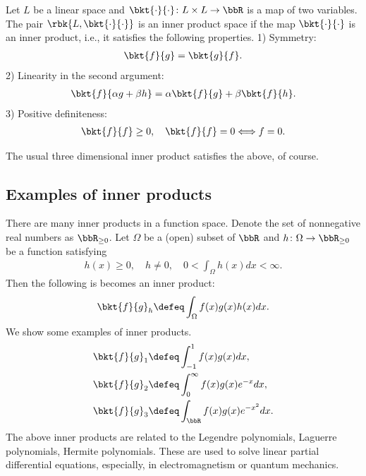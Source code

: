 \documentclass[openany, a4paper, oneside]{jsbook}
\begin{document}
\begin{axm}
 Let $L$ be a linear space and $\bkt{\cdot}{\cdot} \colon L \times L \to \bbR$ is a map of two variables.
 The pair $\rbk{L, \bkt{\cdot}{\cdot}}$ is an inner product space if the map $\bkt{\cdot}{\cdot}$ is an inner product,
 i.e., it satisfies the following properties.
 1) Symmetry:
  \begin{align}
   \bkt{f}{g} = \bkt{g}{f}.
  \end{align}
 2) Linearity in the second argument:
  \begin{align}
   \bkt{f}{\alpha g + \beta h}
   =
   \alpha \bkt{f}{g} + \beta \bkt{f}{h}.
  \end{align}
 3) Positive definiteness:
  \begin{align}
   \bkt{f}{f} \geq 0, \quad
   \bkt{f}{f} = 0 \Longleftrightarrow f = 0.
  \end{align}
\end{axm}
\begin{rem}
 The usual three dimensional inner product satisfies the above, of course.
\end{rem}
\subsection{Examples of inner products}

There are many inner products in a function space.
Denote the set of nonnegative real numbers as $\bbR_{\geq 0}$.
Let $\Omega$ be a (open) subset of $\bbR$ and $h \colon \Omega \to \bbR_{\geq 0}$ be a function satisfying
\begin{align}
 h(x) \geq 0, \quad
 h \neq 0, \quad
 0 < \int_\Omega h(x) dx < \infty.
\end{align}
Then the following is becomes an inner product:
\begin{align}
 \bkt{f}{g}_{h}
 \defeq
 \int_{\Omega} f(x) g(x) h(x) dx.
\end{align}
We show some examples of inner products.
\begin{align}
 \bkt{f}{g}_1
 &\defeq
 \int_{-1}^{1} f(x) g(x) dx, \\
 \bkt{f}{g}_2
 &\defeq
 \int_{0}^{\infty} f(x) g(x) e^{-x} dx, \\
 \bkt{f}{g}_3
 &\defeq
 \int_{\bbR} f(x) g(x) e^{-x^2} dx.
\end{align}
The above inner products are related to
the Legendre polynomials, Laguerre polynomials, Hermite polynomials.
These are used to solve linear partial differential equations,
especially, in electromagnetism or quantum mechanics.
\end{document}
